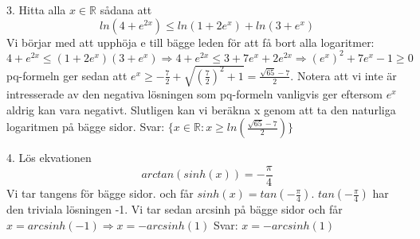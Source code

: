 \documentclass{article}
\begin{document}
  3. Hitta alla $x \in \mathbb{R}$ sådana att 
  \begin{equation}
      ln(4 + e^{2x}) \leq ln(1 + 2e^x) + ln(3 + e^x)
  \end{equation}
  Vi börjar med att upphöja e till bägge leden för att få bort alla logaritmer:\newline
  $4 + e^{2x} \leq (1 + 2e^x)(3 + e^x) \Rightarrow 4 + e^{2x} \leq 3 + 7e^x + 2e^{2x} \Rightarrow (e^x)^2 + 7e^x - 1 \geq 0$\newline pq-formeln ger sedan att $e^x \geq -\frac{7}{2} + \sqrt{(\frac{7}{2})^2 + 1} = \frac{\sqrt{65} - 7}{2}$. Notera att vi inte är intresserade av den negativa lösningen som pq-formeln vanligvis ger eftersom $e^x$ aldrig kan vara negativt. Slutligen kan vi beräkna x genom att ta den naturliga logaritmen på bägge sidor.\newline \newline
  Svar: $\{x \in \mathbb{R}: x \geq ln(\frac{\sqrt{65} - 7}{2})\}$\newline
  
  4. Lös ekvationen 
  \begin{equation}
      arctan(sinh(x)) = -\frac{\pi}{4}
  \end{equation}
  Vi tar tangens för bägge sidor. och får $sinh(x) = tan(-\frac{\pi}{4})$. $tan(-\frac{\pi}{4})$ har den triviala lösningen -1. Vi tar sedan arcsinh på bägge sidor och får $x = arcsinh(-1) \Rightarrow x = -arcsinh(1)$ \newline \newline
  Svar: $x = -arcsinh(1)$
  
\end{document}
